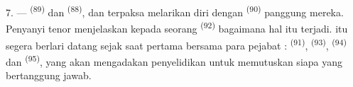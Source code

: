 7. ---  \textsuperscript{(89)} dan  \textsuperscript{(88)},  dan
 terpaksa melarikan diri dengan 
\textsuperscript{(90)} panggung mereka. Penyanyi tenor menjelaskan
kepada seorang  \textsuperscript{(92)} bagaimana hal
itu terjadi.  itu segera berlari datang sejak saat
pertama bersama para pejabat :  \textsuperscript{(91)},
 \textsuperscript{(93)}, 
\textsuperscript{(94)} dan 
\textsuperscript{(95)}, yang akan mengadakan penyelidikan untuk
memutuskan siapa yang bertanggung jawab.

\VUsaut{6.0mm}
\VUfilet{22mm}
